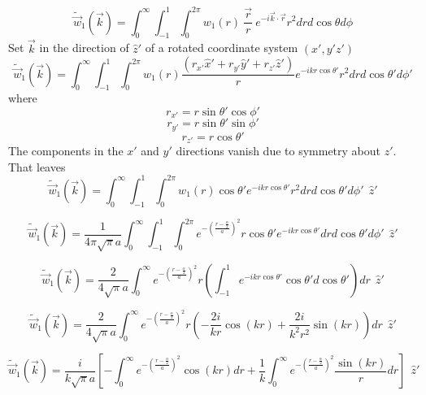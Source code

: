 \documentclass[12pt]{article}
\begin{document}
\begin{equation}{\widetilde{\vec{w}}_1(\vec{k})=\int_{0}^{\infty}\int_{-1}^{1}\int_{0}^{2\pi}w_1(r){~}\frac{\vec{r}}{r}{~}e^{-i\vec{k}\cdot{\vec{r}}}r^2d{r}d{\cos\theta}d{\phi}}\end{equation}
Set $\vec{k}$ in the direction of $\hat{z}'$ of a rotated coordinate system $(x',y'z')$ 
\begin{equation}{\widetilde{\vec{w}}_1(\vec{k})=\int_{0}^{\infty}\int_{-1}^{1}\int_{0}^{2\pi}w_1(r)\frac{(r_{x'}\hat{x}'+r_{y'}\hat{y}'+r_{z'}\hat{z}')}{r}e^{-ikr\cos\theta'}r^2d{r}d{\cos\theta'}d{\phi'}}\end{equation}
where 
\begin{displaymath}{r_{x'}=r\sin\theta'\cos\phi'}\end{displaymath}
\begin{displaymath}{r_{y'}=r\sin\theta'\sin\phi'}\end{displaymath}
\begin{displaymath}{r_{z'}=r\cos\theta'}\end{displaymath} 
The components in the $x'$ and $y'$ directions vanish due to symmetry about $z'$. That leaves
\begin{equation}{\widetilde{\vec{w}}_1(\vec{k})=\int_{0}^{\infty}\int_{-1}^{1}\int_{0}^{2\pi}w_1(r)\cos{\theta}'e^{-ikr\cos\theta'}r^2d{r}d{\cos\theta'}d{\phi'}{~~}\hat{z}'}\end{equation}

\begin{equation}{\widetilde{\vec{w}}_1(\vec{k})=\frac{1}{4\pi\sqrt{\pi}a}\int_{0}^{\infty}\int_{-1}^{1}\int_{0}^{2\pi}e^{-\left(\frac{r-\frac{\alpha}{2}}{a}\right)^2}r\cos{\theta}'e^{-ikr\cos\theta'}d{r}d{\cos\theta'}d{\phi'}{~~}\hat{z}'}\end{equation}

\begin{equation}{\widetilde{\vec{w}}_1(\vec{k})=\frac{2}{4\sqrt{\pi}a}\int_{0}^{\infty}e^{-\left(\frac{r-\frac{\alpha}{2}}{a}\right)^2}r\left(\int_{-1}^{1}e^{-ikr\cos\theta'}\cos{\theta}'d{\cos\theta'}\right)d{r}{~~}\hat{z}'}\end{equation}

\begin{equation}{\widetilde{\vec{w}}_1(\vec{k})=\frac{2}{4\sqrt{\pi}a}\int_{0}^{\infty}e^{-\left(\frac{r-\frac{\alpha}{2}}{a}\right)^2}r\left(-\frac{2i}{kr}\cos(kr)+\frac{2i}{k^2r^2}\sin(kr)\right)d{r}{~~}\hat{z}'}\end{equation}

\begin{equation}{\widetilde{\vec{w}}_1(\vec{k})=\frac{i}{k\sqrt{\pi}a}\left[-\int_{0}^{\infty}e^{-\left(\frac{r-\frac{\alpha}{2}}{a}\right)^2}\cos(kr)d{r}+\frac{1}{k}\int_{0}^{\infty}e^{-\left(\frac{r-\frac{\alpha}{2}}{a}\right)^2}\frac{\sin(kr)}{r}d{r}\right]{~~}\hat{z}'}\end{equation}
\end{document}
